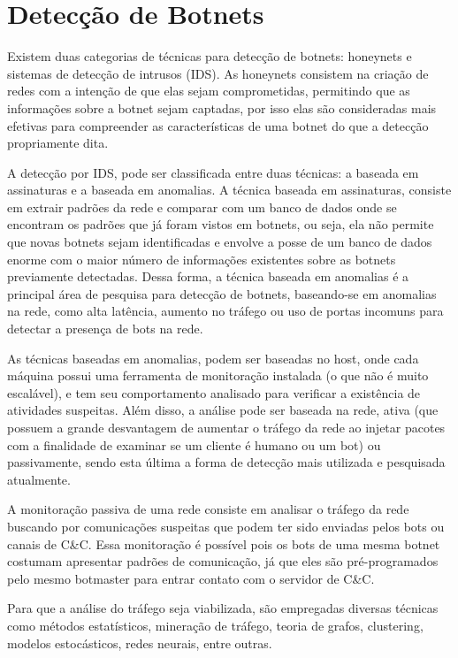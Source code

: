 \section{Detecção de Botnets}

Existem duas categorias de técnicas para detecção de botnets: honeynets e sistemas de detecção de intrusos (IDS). As honeynets consistem na criação de redes com a intenção de que elas sejam comprometidas, permitindo que as informações sobre a botnet sejam captadas, por isso elas são consideradas mais efetivas para compreender as características de uma botnet do que a detecção propriamente dita.

A detecção por IDS, pode ser classificada entre duas técnicas: a baseada em assinaturas e a baseada em anomalias. A técnica baseada em assinaturas, consiste em extrair padrões da rede e comparar com um banco de dados onde se encontram os padrões que já foram vistos em botnets, ou seja, ela não permite que novas botnets sejam identificadas e envolve a posse de um banco de dados enorme com o maior número de informações existentes sobre as botnets previamente detectadas. Dessa forma, a técnica baseada em anomalias é a principal área de pesquisa para detecção de botnets, baseando-se em anomalias na rede, como alta latência, aumento no tráfego ou uso de portas incomuns para detectar a presença de bots na rede.

As técnicas baseadas em anomalias, podem ser baseadas no host, onde cada máquina possui uma ferramenta de monitoração instalada (o que não é muito escalável), e tem seu comportamento analisado para verificar a existência de atividades suspeitas. Além disso, a análise pode ser baseada na rede, ativa (que possuem a grande desvantagem de aumentar o tráfego da rede ao injetar pacotes com a finalidade de examinar se um cliente é humano ou um bot) ou passivamente, sendo esta última a forma de detecção mais utilizada e pesquisada atualmente.

A monitoração passiva de uma rede consiste em analisar o tráfego da rede buscando por comunicações suspeitas que podem ter sido enviadas pelos bots ou canais de C\&C. Essa monitoração é possível pois os bots de uma mesma botnet costumam apresentar padrões de comunicação, já que eles são pré-programados pelo mesmo botmaster para entrar contato com o servidor de C\&C.

Para que a análise do tráfego seja viabilizada, são empregadas diversas técnicas como métodos estatísticos, mineração de tráfego, teoria de grafos, clustering, modelos estocásticos, redes neurais, entre outras.

